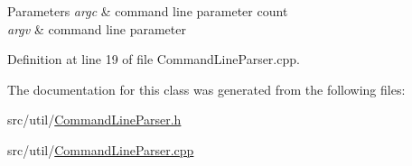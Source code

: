 \begin{DoxyParams}{Parameters}
{\em argc} & command line parameter count \\
\hline
{\em argv} & command line parameter \\
\hline
\end{DoxyParams}


Definition at line 19 of file Command\+Line\+Parser.\+cpp.



The documentation for this class was generated from the following files\+:\begin{DoxyCompactItemize}
\item 
src/util/\hyperlink{_command_line_parser_8h}{Command\+Line\+Parser.\+h}\item 
src/util/\hyperlink{_command_line_parser_8cpp}{Command\+Line\+Parser.\+cpp}\end{DoxyCompactItemize}
